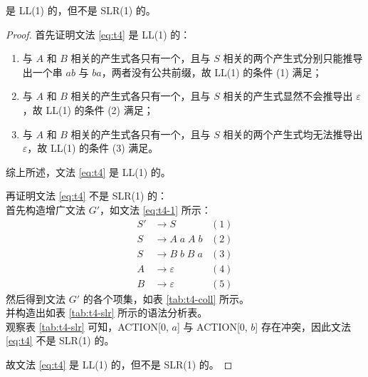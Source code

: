 \documentclass[12pt]{ctexart}
\begin{document}
    是 LL(1) 的，但不是 SLR(1) 的。

    \begin{proof}
        首先证明文法 \eqref{eq:t4} 是 LL(1) 的：
        \begin{enumerate}
            \item 与 $A$ 和 $B$ 相关的产生式各只有一个，且与 $S$ 相关的两个产生式分别只能推导出一个串 $ab$ 与 $ba$，两者没有公共前缀，故 LL(1) 的条件 (1) 满足；
            \item 与 $A$ 和 $B$ 相关的产生式各只有一个，且与 $S$ 相关的产生式显然不会推导出 $\varepsilon$，故 LL(1) 的条件 (2) 满足；
            \item 与 $A$ 和 $B$ 相关的产生式各只有一个，且与 $S$ 相关的两个产生式均无法推导出 $\varepsilon$，故 LL(1) 的条件 (3) 满足。
        \end{enumerate}
        综上所述，文法 \eqref{eq:t4} 是 LL(1) 的。

        再证明文法 \eqref{eq:t4} 不是 SLR(1) 的：\\
        首先构造增广文法 $G'$，如文法 \eqref{eq:t4-1} 所示：
        \begin{equation}
            \label{eq:t4-1}
            \begin{aligned}
                S'  &\to S          &(1)    \\
                S   &\to A\;a\;A\;b &(2)    \\
                S   &\to B\;b\;B\;a &(3)    \\
                A &\to \varepsilon  &(4)    \\
                B &\to \varepsilon  &(5)
            \end{aligned}
        \end{equation}
        然后得到文法 $G'$ 的各个项集，如表 \ref{tab:t4-coll} 所示。\\
        并构造出如表 \ref{tab:t4-slr} 所示的语法分析表。\\
        观察表 \ref{tab:t4-slr} 可知，ACTION[0, $a$] 与 ACTION[0, $b$] 存在冲突，因此文法 \eqref{eq:t4} 不是 SLR(1) 的。

        故文法 \eqref{eq:t4} 是 LL(1) 的，但不是 SLR(1) 的。
    \end{proof}
\end{document}
